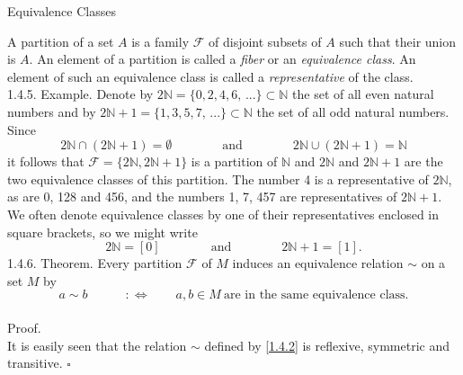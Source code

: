 \documentclass[smaller,hyperref={CJKbookmarks=true}]{beamer}
\newcommand{\N}{\mathbb{N}} \newcommand{\Z}{\mathbb{Z}} \newcommand{\Q}{\mathbb{Q}}
\begin{document}
\begin{frame}{Equivalence Classes}
\begin{spacing}{1.2}
A partition of a set $A$ is a family $\mathcal{F}$ of disjoint subsets of $A$ such that their
union is $A$. An element of a partition is called a \emph{fiber} or an \emph{equivalence
class}. An element of such an equivalence class is called a \emph{representative} of
the class.\\[6pt]
\alert{1.4.5. Example.} Denote by $2\N=\{0,2,4,6,\,...\}\subset\N$ the set of all even natural numbers and by $2\N+1=\{1,3,5,7,\,...\}\subset\N$ the set of all odd natural numbers. Since\\[3pt]
\[2\N\cap(2\N+1)=\emptyset\qquad\qquad
\text{and}\qquad\qquad
2\N\cup(2\N+1)=\N\]
it follows that $\mathcal{F}=\{2\N,2\N+1\}$ is a partition of $\N$ and $2\N$ and $2\N+1$ are the two equivalence classes of this partition. The number 4 is a representative of $2\N$, as are 0, 128 and 456, and the numbers 1, 7, 457 are representatives of $2\N+1$.
\newpage
We often denote equivalence classes by one of their representatives
enclosed in square brackets, so we might write
\[2\N=[0]\qquad\qquad
\text{and}\qquad\qquad
2\N+1=[1].\]
\alert{1.4.6. Theorem.} Every partition $\mathcal{F}$ of $M$ induces an equivalence relation $\sim$ on a set $M$ by
\begin{equation}\label{1.4.2}
  a\sim b\qquad\quad:\Leftrightarrow\qquad
  a,b\in M~\text{are in the same equivalence class.}
\end{equation}
 \\[7pt]
\alert{Proof.}\\
It is easily seen that the relation $\sim$ defined by \eqref{1.4.2} is reflexive, symmetric and transitive.
\quad$\square$
\end{spacing}
\end{frame}
\end{document}
